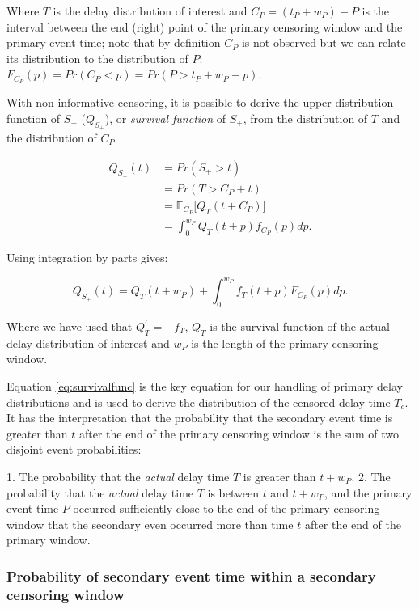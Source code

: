 \documentclass[10pt,letterpaper]{article}
\begin{document}
Where $T$ is the delay distribution of interest and $C_P = (t_P + w_P) - P$ is the interval between the end (right) point of the primary censoring window and the primary event time; note that by definition $C_P$ is not observed but we can relate its distribution to the distribution of $P$: $F_{C_P}(p) = Pr(C_P < p) = Pr(P > t_P + w_P - p)$.

With non-informative censoring, it is possible to derive the upper distribution function of $S_+$ ($Q_{S_+}$), or \textit{survival function} of $S_+$, from the distribution of $T$ and the distribution of $C_P$.


\begin{equation}
\begin{split}
Q_{S_+}(t) &= Pr(S_+ > t) \\
&= Pr(T > C_P + t) \\
&= \mathbb{E}_{C_P} \Big[Q_T(t + C_P)\Big] \\
&= \int_0^{w_P} Q_T(t + p) f_{C_P}(p) dp.
\end{split}
\end{equation}


Using integration by parts gives:

\begin{equation}
\label{eq:survivalfunc}
Q_{S_+}(t) = Q_T(t + w_P) + \int_0^{w_P} f_T(t+p) F_{C_P}(p) dp.
\end{equation}

Where we have used that $Q^{'}_{T} = - f_T$, $Q_T$ is the survival function of the actual delay distribution of interest and $w_P$ is the length of the primary censoring window.

Equation \ref{eq:survivalfunc} is the key equation for our handling of primary delay distributions and is used to derive the distribution of the censored delay time $T_c$. It has the interpretation that the probability that the secondary event time is greater than $t$ after the end of the primary censoring window is the sum of two disjoint event probabilities:

1. The probability that the \textit{actual} delay time $T$ is greater than $t + w_P$.
2. The probability that the \textit{actual} delay time $T$ is between $t$ and $t + w_P$, and the primary event time $P$ occurred sufficiently close to the end of the primary censoring window that the secondary even occurred more than time $t$ after the end of the primary window.

\subsubsection{Probability of secondary event time within a secondary censoring window}
\end{document}

